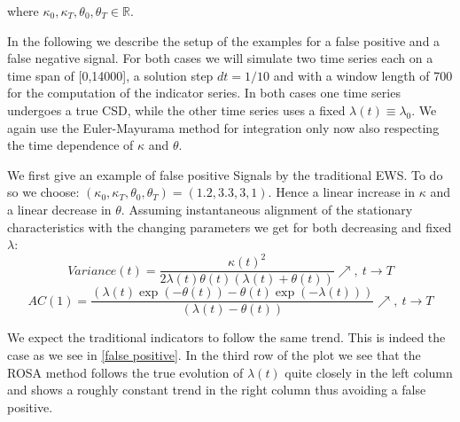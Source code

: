 \documentclass[%
thesis=student,%
coverpage=false,%
titlepage=false,%
headmarks=true, %
german,%
font=libertine, %
math=newpxtx, %
BCOR=5mm,%
coverBCOR=11mm%
]{tumbook}
\begin{document}
where $\kappa_{0},\kappa_{T},\theta_{0},\theta_{T} \in \mathbb{R}$. 

In the following we describe the setup of the examples for a false positive and a false negative signal. For both cases we will simulate two time series each on a time span of [0,14000], a solution step $dt = 1/10$ and with a window length of 700 for the computation of the indicator series. In both cases one time series undergoes a true CSD, while the other time series uses a fixed $\lambda(t) \equiv \lambda_{0}$. We again use the Euler-Mayurama method for integration only now also respecting the time dependence of $\kappa$ and $\theta$.

We first give an example of false positive Signals by the traditional EWS. To do so we choose: $(\kappa_{0},\kappa_{T},\theta_{0},\theta_{T}) = (1.2,3.3,3,1)$. Hence a linear increase in $\kappa$ and a linear decrease in $\theta$. Assuming instantaneous alignment of the stationary characteristics with the changing parameters we get for both decreasing and fixed $\lambda$: 
\[
Variance(t) = \frac{\kappa(t)^2}{2\lambda(t)\theta(t)(\lambda(t) + \theta(t))} \nearrow, \ t \rightarrow T
\]
\[
AC(1) = \frac{(\lambda(t)\exp(-\theta(t))-\theta(t)\exp(-\lambda(t)))}{(\lambda(t)-\theta(t))} \nearrow, \ t \rightarrow T
\]

We expect the traditional indicators to follow the same trend. This is indeed the case as we see in \ref{false positive}. In the third row of the plot we see that the ROSA method follows the true evolution of $\lambda(t)$ quite closely in the left column and shows a roughly constant trend in the right column thus avoiding a false positive.
\end{document}
